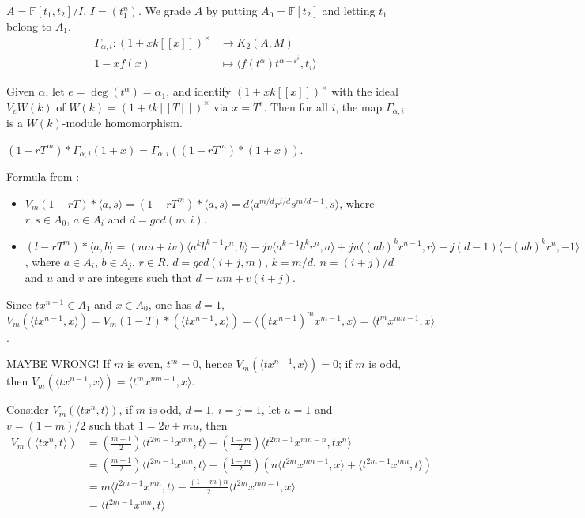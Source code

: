 \cite{MR88f:18018}$A=\mathbb{F}[t_1,t_2]/I$, $I=(t_1^n)$. We grade $A$ by putting $A_0=\mathbb{F}[t_2]$ and letting $t_1$ belong to $A_1$.
\begin{align*}
\Gamma_{\alpha,i}\colon (1+xk[[x]])^{\times} &\longrightarrow K_2(A,M) \\
1-xf(x) &\mapsto \langle f(t^\alpha)t^{\alpha-\varepsilon^i},t_i \rangle
\end{align*}
\begin{lemma}
Given $\alpha$, let $e = \deg (t^\alpha) = \alpha_1$, and identify $(1+xk[[x]])^{\times}$ with the ideal $V_e W(k)$ of $W(k)=(1+tk[[T]])^{\times}$ via $x = T^e$. Then for all $i$, the map $\Gamma_{\alpha,i}$ is a $W(k)$-module homomorphism.
\end{lemma}
$(1-rT^m)*\Gamma_{\alpha,i}(1+x)=\Gamma_{\alpha,i}((1-rT^m)*(1+x))$.

Formula from \cite{MR88f:18018}: 
\begin{itemize}
	\item $V_m(1-rT)*\langle a, s\rangle=(1 - rT^m) *\langle a, s\rangle = d\langle a^{m/d}r^{i/d}s^{m/d-1}, s\rangle$,  where $r, s\in A_0$, $a\in A_i$ and $d = gcd(m, i)$. 
	\item $(l-rT^m)*\langle a,b\rangle  = (um+iv)\langle a^k b^{k-1}r^n,b\rangle - jv\langle a^{k-1} b^k r^n,a\rangle + ju\langle  (ab)^k r^{n-1}, r\rangle + j(d-1)\langle -(ab)^kr^n, -1 \rangle$,  where $a\in A_i$,  $b\in A_j$, $r\in R$, $d = gcd(i + j, m)$, $k = m/d$, $n = (i + j)/d$ and $u$ and $v$ are integers such that $d = um + v(i +j)$.
\end{itemize}

Since $tx^{n-1}\in A_1$ and $x\in A_0$, one has $d=1$, $V_m(\langle tx^{n-1},x \rangle)=V_m(1-T)*(\langle tx^{n-1},x \rangle)=\langle (tx^{n-1})^m x^{m-1},x \rangle=\langle t^mx^{mn-1},x \rangle$. 

{\color{red}MAYBE WRONG! If $m$ is even, $t^m=0$, hence $V_m(\langle tx^{n-1},x \rangle)=0$; if $m$ is odd, then $V_m(\langle tx^{n-1},x \rangle)=\langle t^mx^{mn-1},x \rangle$.}

Consider $V_m(\langle tx^n,t \rangle)$, if $m$ is odd, $d=1$, $i=j=1$, let $u=1$ and $v=(1-m)/2$ such that $1=2v+mu$, then 
\begin{align*}
V_m(\langle tx^n,t \rangle) &= (\frac{m+1}{2})\langle t^{2m-1}x^{mn},t\rangle - (\frac{1-m}{2})\langle t^{2m-1}x^{mn-n}, tx^n \rangle \\
&= (\frac{m+1}{2})\langle t^{2m-1}x^{mn},t\rangle - (\frac{1-m}{2}) (n\langle t^{2m}x^{mn-1},x \rangle +\langle  t^{2m-1}x^{mn},t\rangle) \\
& = m\langle t^{2m-1}x^{mn},t\rangle - \frac{(1-m)n}{2}\langle t^{2m}x^{mn-1},x \rangle \\
& = \langle t^{2m-1}x^{mn},t\rangle
\end{align*}


